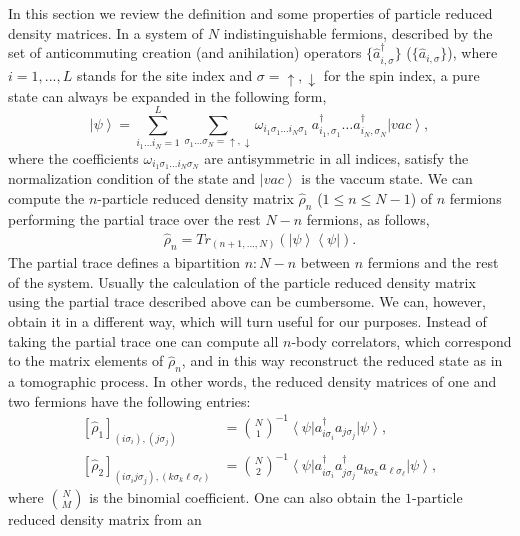 \documentclass[prb,reprint,showpacs,twocolumn,superscriptaddress]{revtex4-2}
\newcommand{\bra}[1]{\left\langle #1 \right|}
\newcommand{\ket}[1]{\left| #1 \right\rangle}
\newcommand{\ad}[1]{\hat a^{\dagger}_{#1}}
\begin{document}
In this section we review the definition and some properties of particle reduced density matrices.
In a system of $N$ indistinguishable fermions, described by the set of anticommuting creation 
(and anihilation) operators $\{\ad{i,\sigma}\}$ ($\{\hat a_{i,\sigma}\}$), 
where $i=1,...,L$ stands for the site index and $\sigma = \uparrow,\downarrow$ for the spin index, 
a pure state can always be expanded in the following form,
\begin{equation}
 \ket{\psi} = \sum_{i_{1}\dots i_{N}=1}^{L} 
 \sum_{\sigma_{1}\dots \sigma_{N}=\uparrow,\downarrow} \omega_{i_{1}\sigma_1\dots i_{N}\sigma_1}\ a_{i_{1},\sigma_1}^{\dagger}\dots a_{i_{N},\sigma_N}^{\dagger}\ket{vac},
 \label{staterep}
\end{equation} 
where the coefficients $\omega_{i_{1}\sigma_1\dots i_{N}\sigma_N}$ are antisymmetric in all indices, 
 satisfy the normalization condition of the state and $\ket{vac}$ is the vaccum state.
We can compute the $n$-particle reduced density matrix $\hat \rho_n$ ($1\le n \le N-1$) of $n$  
fermions performing the partial trace over the rest $N-n$ fermions, as follows,
\begin{align}
\hat \rho_{n} = Tr_{(n+1,\dots,N)}\left( \ket{\psi}\bra{\psi}\right).
\end{align}
The partial trace  defines a bipartition $n:N-n$ between $n$ fermions and the rest of the system. 
Usually the calculation of the particle reduced density matrix using 
the partial trace described above can be cumbersome. 
We can, however, obtain it in a different way, which will turn useful for our purposes. 
Instead of taking the partial trace one can compute all $n$-body correlators, 
which correspond to the matrix elements of $\hat \rho_{n}$, 
and in this way reconstruct the reduced state as in a tomographic process. 
In other words, the reduced density matrices of one and two fermions have the following entries:
\begin{align}
\left[\hat \rho_{1}\right]_{\left(i\sigma_{i}\right),\left(j\sigma_{j}\right)} &= \binom{N}{1}^{-1}\bra{\psi} a_{i\sigma_{i}}^{\dagger}a_{j\sigma_{j}}\ket{\psi},\\
\left[\hat \rho_{2}\right]_{\left(i\sigma_{i}j\sigma_{j}\right),\left(k\sigma_{k}\ell\sigma_{\ell}\right)} &= \binom{N}{2}^{-1}\bra{\psi} a_{i\sigma_{i}}^{\dagger}a_{j\sigma_{j}}^{\dagger}a_{k\sigma_{k}}a_{\ell\sigma_{\ell}}\ket{\psi},\label{eq.2body.rdm.definition}
\end{align}
where $\binom{N}{M}$ is the binomial coefficient. 
One can  also obtain the $1$-particle reduced density matrix from an 
\end{document}
